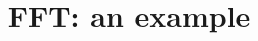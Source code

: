\documentclass[mathserif]{beamer}
\title{FFT: an example }
\date{}
\begin{document}

\frame{\titlepage}


%
%
%
%
%
%
%
%
%
%
%
\end{document}
